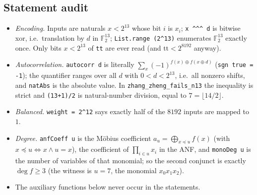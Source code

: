 \documentclass[11pt]{article}
\numberwithin{equation}{section}
\theoremstyle{definition}
\theoremstyle{remark}
\newcommand{\F}{\mathbb F}
\begin{document}
\subsection{Statement audit}
\begin{itemize}
\item \emph{Encoding.} Inputs are naturals $x<2^{13}$ whose bit $i$ is $x_i$; \texttt{x \textasciicircum{}\textasciicircum{}\textasciicircum{} d} is
bitwise xor, i.e.\ translation by $d$ in $\F_2^{13}$; \texttt{List.range (2\textasciicircum{}13)} enumerates $\F_2^{13}$
exactly once. Only bits $x<2^{13}$ of \texttt{tt} are ever read (and $\mathrm{tt}<2^{8192}$ anyway).
\item \emph{Autocorrelation.} \texttt{autocorr d} is literally $\sum_{x}(-1)^{f(x)\oplus f(x\oplus d)}$
(\texttt{sgn true = -1}); the quantifier ranges over all $d$ with $0<d<2^{13}$, i.e.\ all nonzero shifts,
and \texttt{natAbs} is the absolute value. In \texttt{zhang\_zheng\_fails\_n13} the inequality is strict and
\texttt{(13+1)/2} is natural-number division, equal to $7=\lfloor 14/2\rfloor$.
\item \emph{Balanced.} \texttt{weight = 2\textasciicircum{}12} says exactly half of the $8192$ inputs are mapped to $1$.
\item \emph{Degree.} \texttt{anfCoeff u} is the Möbius coefficient $a_u=\bigoplus_{x\preceq u}f(x)$ (with
$x\preceq u\iff x\wedge u=x$), the coefficient of $\prod_{i\in u}x_i$ in the ANF, and \texttt{monoDeg u}
is the number of variables of that monomial; so the second conjunct is exactly $\deg f\ge3$
(the witness is $u=7$, the monomial $x_0x_1x_2$).
\item The auxiliary functions below never occur in the statements.
\end{itemize}
\end{document}
